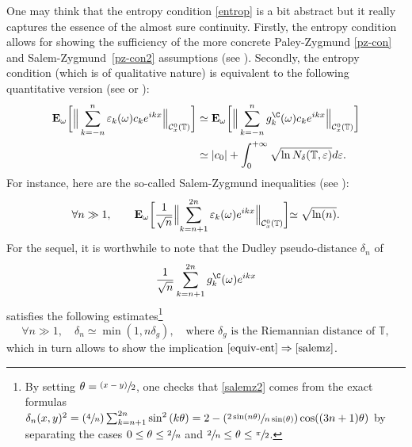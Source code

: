 \documentclass[JEP,XML,SOM,Unicode,NoEqCountersInSection,published]{cedram}
\newcommand{\Psfrac}[2]{(\sfrac{#1}{#2})}
\newcommand{\psfrac}[2]{\sfrac{(#1)}{#2}}
\theoremstyle{theorem}
\theoremstyle{definition}
\newcommand\E{\mathbf{E}}
\newcommand\CC{\mathcal{C}}
\newcommand\T{\mathbb{T}}
\newcommand\ep{\varepsilon}
\begin{document}
One may think that the entropy condition \eqref{entrop} is a bit abstract but it really captures the essence of the almost sure continuity.
Firstly, the entropy condition allows for showing the sufficiency of the more concrete Paley-Zygmund \eqref{pz-con} and Salem-Zygmund~\eqref{pz-con2} assumptions (see \cite[Part VII.1]{pisier1981}).
Secondly, the entropy condition (which is of qualitative nature) is equivalent to the following quantitative version (see \cite[p.\,11]{pisier1981} or \cite[p.\,3--4]{pisier1977}):\vspace*{-3pt}
\begin{equation}\label{equiv-ent}
\begin{aligned}
\E_\omega\biggl[\Big\|\sum_{k=-n}^n \ep_k(\omega) c_k e^{ikx} \Big\|_{\CC_x^0(\mathcal{\mathbb{T}})}\biggr] & \simeq \E_\omega\biggl[\Big\|\sum_{k=-n}^n g_k^{\C}(\omega) c_k e^{ikx} \Big\|_{\CC_x^0(\mathcal{\mathbb{T}})}\biggr]\\ 
& \simeq |c_0|+\int_{0}^{+\infty} \sqrt{\ln N_{\delta}(\T,\ep)} d\ep.
\end{aligned}
\end{equation}
For instance, here are the so-called Salem-Zygmund inequalities (see \cite[p.\,259]{queff2}):\vspace*{-3pt}
\begin{equation}\label{salemz}
\forall n\gg 1, \qquad \E_{\omega}\biggl[\frac{1}{\sqrt{n}}\Bigl\Vert \sum_{k=n+1}^{2n}\ep_k(\omega) e^{ikx} \Bigr\Vert_{\CC_x^0(\mathbb{T})} \biggl]\simeq \sqrt{\ln(n)}.
\end{equation}
For the sequel, it is worthwhile to note that the Dudley pseudo-distance $\delta_n$ of\vspace*{-3pt}
\begin{equation*}
\frac{1}{\sqrt{n}}\sum_{k=n+1}^{2n}g_k^{\C}(\omega) e^{ikx}
\end{equation*} satisfies the following estimates\footnote{
By setting $\theta=\psfrac{x-y}{2}$, one checks that \eqref{salemz2} comes from the exact formulas $\delta_n(x,y)^2 = \Psfrac{4}{n}\sum_{k=n+1}^{2n} \sin^2\left(k\theta\right)=2-\Psfrac{2\sin(n\theta)}{n\sin(\theta)}\cos((3n+1)\theta)$ by separating the cases $0\leq \theta\leq \sfrac{2}{n}$ and $\sfrac{2}{n}\leq \theta\leq \sfrac{\pi}{2}$.}
\begin{equation}\label{salemz2}
\forall n\gg1, \quad \delta_n\simeq \min(1,n\delta_{g}), \quad \text{where $\delta_{g}$ is the Riemannian distance of }\mathbb{T},
\end{equation}
which in turn allows to show the implication $\eqref{equiv-ent}\Rightarrow\eqref{salemz}$.
\end{document}
